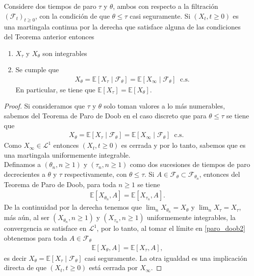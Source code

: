 \begin{theorem}
Considere dos tiempos de paro $\tau$ y $\theta$, ambos con respecto a la filtración $(\mathcal{F}_t)_{t \geq 0}$, con la condición de que $\theta \leq \tau$ casi seguramente. Si $(X_t, t \geq 0)$ es una martingala continua por la derecha que satisface alguna de las condiciones del Teorema anterior entonces
\begin{enumerate}
\item $X_{\tau}$ y $X_{\theta}$ son integrables
\item Se cumple que 
\begin{align*}
X_{\theta} = \mathbb{E}[X_{\tau} \mid \mathcal{F}_{\theta}] = \mathbb{E}[X_{\infty} \mid \mathcal{F}_{\theta}] \ \text{ c.s. }
\end{align*}
En particular, se tiene que $\mathbb{E}[X_{\tau}] = \mathbb{E}[X_{\theta}]$.
\end{enumerate}
\end{theorem}
\begin{proof}
Si consideramos que $\tau$ y $\theta$ solo toman valores a lo más numerables, sabemos del Teorema de Paro de Doob en el caso discreto que para $\theta \leq \tau$ se tiene que 
\begin{align*}
X_{\theta} = \mathbb{E}[X_{\tau} \mid \mathcal{F}_{\theta}] = \mathbb{E}[X_{\infty} \mid \mathcal{F}_{\theta}] \ \text{ c.s. }
\end{align*}
Como $X_{\infty} \in \mathcal{L}^{1}$ entonces $(X_t, t \geq 0)$ es cerrada y por lo tanto, sabemos que es una martingala uniformemente integrable. \\

Definamos a $(\theta_n, n \geq 1)$ y $(\tau_n, n \geq 1)$ como dos sucesiones de tiempos de paro decrecientes a $\theta$ y $\tau$ respectivamente, con $\theta \leq \tau$. Si $A \in \mathcal{F}_{\theta} \subset \mathcal{F}_{\theta_n}$, entonces  del Teorema de Paro de Doob, para toda $n \geq 1$ se tiene
\begin{align}
\mathbb{E} \left[ X_{\theta_{n}}, A \right] = \mathbb{E} \left[ X_{\tau_{n}}, A \right]. \label{paro_doob2}
\end{align}
De la continuidad por la derecha tenemos que $\lim_n X_{\theta_n} = X_{\theta}$ y $\lim_n X_{\tau} = X_{\tau}$, más aún, al ser $(X_{\theta_n}, n \geq 1)$ y $(X_{\tau_n}, n \geq 1)$ uniformemente integrables, la convergencia se satisface en $\mathcal{L}^{1}$, por lo tanto, al tomar el límite en \ref{paro_doob2} obtenemos para toda $A \in \mathcal{F}_{\theta}$
\begin{align*}
\mathbb{E} \left[ X_{\theta}, A \right] = \mathbb{E} \left[ X_{\tau}, A \right],
\end{align*}
es decir $X_{\theta} = \mathbb{E}[X_{\tau} \mid \mathcal{F}_{\theta}]$ casi seguramente. La otra igualdad es una implicación directa de que $(X_{t}, t \geq 0)$ está cerrada por $X_{\infty}$.
\end{proof}

